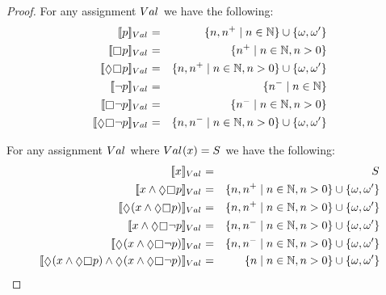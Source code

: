 \begin{proof}
For any assignment $\kAssignment$ we have the following:
\begin{eqnarray*}
    \interpretation[\kAssignment]{\atomP} &=& \{n, n^+ \mid n \in \naturals\} \cup \{\omega, \omega'\}\\
    \interpretation[\kAssignment]{\necessary \atomP} &=& \{n^+ \mid n \in \naturals, n > 0\}\\
    \interpretation[\kAssignment]{\possible \necessary \atomP} &=& \{n, n^+ \mid n \in \naturals, n > 0\} \cup \{\omega, \omega'\}\\
    \interpretation[\kAssignment]{\neg \atomP} &=& \{n^- \mid n \in \naturals\}\\
    \interpretation[\kAssignment]{\necessary \neg \atomP} &=& \{n^- \mid n \in \naturals, n > 0\}\\
    \interpretation[\kAssignment]{\possible \necessary \neg \atomP} &=& \{n, n^- \mid n \in \naturals, n > 0\} \cup \{\omega, \omega'\}
\end{eqnarray*}

For any assignment $\kAssignment$ where $\kAssignment(\varX) = \kStates$ we have the following:
\begin{eqnarray*}
    \interpretation[\kAssignment]{\varX} &=& \kStates\\
    \interpretation[\kAssignment]{\varX \land \possible \necessary \atomP} &=& \{n, n^+ \mid n \in \naturals, n > 0\} \cup \{\omega, \omega'\}\\
    \interpretation[\kAssignment]{\possible (\varX \land \possible \necessary \atomP)} &=& \{n, n^+ \mid n \in \naturals, n > 0\} \cup \{\omega, \omega'\}\\
    \interpretation[\kAssignment]{\varX \land \possible \necessary \neg \atomP} &=& \{n, n^- \mid n \in \naturals, n > 0\} \cup \{\omega, \omega'\}\\
    \interpretation[\kAssignment]{\possible (\varX \land \possible \necessary \neg \atomP)} &=& \{n, n^- \mid n \in \naturals, n > 0\} \cup \{\omega, \omega'\}\\
    \interpretation[\kAssignment]{\possible (\varX \land \possible \necessary \atomP) \land \possible (\varX \land \possible \necessary \neg \atomP)} &=& \{n \mid n \in \naturals, n > 0\} \cup \{\omega, \omega'\}
\end{eqnarray*}


\end{proof}

